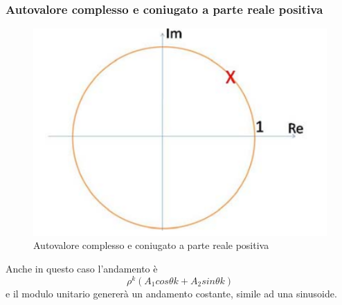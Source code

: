 \documentclass[a4paper]{report}
\begin{document}
\subsubsection{Autovalore complesso e coniugato a parte reale positiva}
\begin{figure}[!h]
  \begin{center}
    \includegraphics[scale=0.3]{./figures/autovaloreComplessoConiugatoRealePositivoCirconferenza00.png} 
    \caption{Autovalore complesso e coniugato a parte reale
      positiva}\label{fig:autovaloreComplessoConiugatoRealePositivoCirconferenza00.png} 
  \end{center}
\end{figure}
Anche in questo caso l'andamento \`e
\[
\rho^k (A_1 cos \theta k + A_2 sin \theta k)
\]
e il modulo unitario generer\`a un andamento costante, simile ad una sinusoide.
\end{document}
